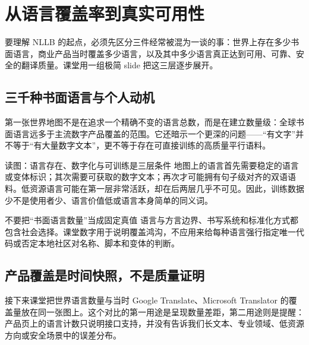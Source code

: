 \section{从语言覆盖率到真实可用性}

要理解 NLLB 的起点，必须先区分三件经常被混为一谈的事：世界上存在多少书面语言，商业产品当时覆盖多少语言，以及其中多少语言真正达到可用、可靠、安全的翻译质量。课堂用一组极简 slide 把这三层逐步展开。

\subsection{三千种书面语言与个人动机}

第一张世界地图不是在追求一个精确不变的语言总数，而是在建立数量级：全球书面语言远多于主流数字产品覆盖的范围。它还暗示一个更深的问题——“有文字”并不等于“有大量数字文本”，更不等于存在可直接训练的高质量平行语料。


\begin{knowledgebox}{读图：语言存在、数字化与可训练是三层条件}
地图上的语言首先需要稳定的语言或变体标识；其次需要可获取的数字文本；再次才可能拥有句子级对齐的双语语料。低资源语言可能在第一层非常活跃，却在后两层几乎不可见。因此，训练数据少不是使用者少、语言价值低或语言本身简单的同义词。
\end{knowledgebox}

\begin{warningbox}{不要把“书面语言数量”当成固定真值}
语言与方言边界、书写系统和标准化方式都包含社会选择。课堂数字用于说明覆盖鸿沟，不应用来给每种语言强行指定唯一代码或否定本地社区对名称、脚本和变体的判断。
\end{warningbox}


\subsection{产品覆盖是时间快照，不是质量证明}

接下来课堂把世界语言数量与当时 Google Translate、Microsoft Translator 的覆盖量放在同一张图上。这个对比的第一用途是呈现数量差距，第二用途则是提醒：产品页上的语言计数只说明接口支持，并没有告诉我们长文本、专业领域、低资源方向或安全场景中的误差分布。

